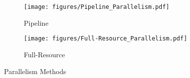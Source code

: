\begin{figure}[t]
    \vspace{-3mm}
    \centering
    \begin{subfigure}[b]{0.15\textwidth} 
        \centering
        \texttt{[image: figures/Pipeline\_Parallelism.pdf]} 
        \caption{Pipeline}
        \vspace{-2mm}
        \label{fig:pipeline}
    \end{subfigure}
    \hspace{10mm}  
    \begin{subfigure}[b]{0.15\textwidth} 
        \centering
        \texttt{[image: figures/Full-Resource\_Parallelism.pdf]}  
        \caption{Full-Resource}
        \vspace{-2mm}
        \label{fig:Full-Resource}
    \end{subfigure}
    \caption{Parallelism Methods}
    \label{fig:parallelism}
    \vspace{-5mm}
\end{figure}
